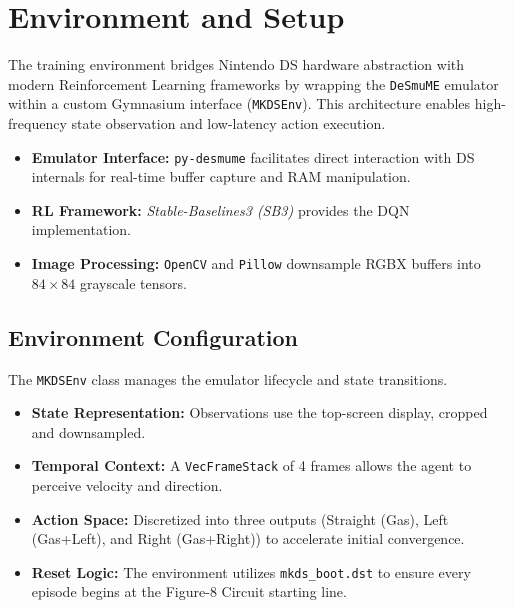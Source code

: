 \documentclass[11pt,a4paper]{article}
\begin{document}
\section{Environment and Setup}
The training environment bridges Nintendo DS hardware abstraction with modern Reinforcement Learning frameworks by wrapping the \texttt{DeSmuME} emulator within a custom Gymnasium interface (\texttt{MKDSEnv}). This architecture enables high-frequency state observation and low-latency action execution.
\begin{itemize}
    \item \textbf{Emulator Interface:} \texttt{py-desmume} facilitates direct interaction with DS internals for real-time buffer capture and RAM manipulation.
    \item \textbf{RL Framework:} \textit{Stable-Baselines3 (SB3)} provides the DQN implementation.
    \item \textbf{Image Processing:} \texttt{OpenCV} and \texttt{Pillow} downsample RGBX buffers into $84 \times 84$ grayscale tensors.
\end{itemize}

\subsection{Environment Configuration}
The \texttt{MKDSEnv} class manages the emulator lifecycle and state transitions.
\begin{itemize}
    \item \textbf{State Representation:} Observations use the top-screen display, cropped and downsampled.
    \item \textbf{Temporal Context:} A \texttt{VecFrameStack} of 4 frames allows the agent to perceive velocity and direction.
    \item \textbf{Action Space:} Discretized into three outputs (Straight (Gas), Left (Gas+Left), and Right (Gas+Right)) to accelerate initial convergence.
    \item \textbf{Reset Logic:} The environment utilizes \texttt{mkds\_boot.dst} to ensure every episode begins at the Figure-8 Circuit starting line.
\end{itemize}
\end{document}
